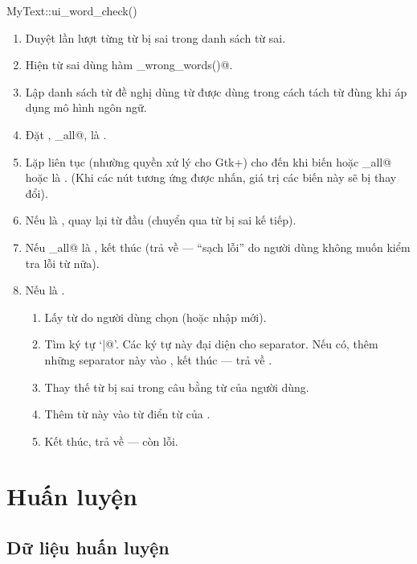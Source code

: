 \documentclass[a4paper,oneside,14pt]{extbook} %
\begin{document}
\begin{algo}
\caption{MyText::ui\_word\_check()}
\label{algo:MyText::ui_word_check}
\begin{enumerate}
\item Duyệt lần lượt từng từ bị sai trong danh sách từ sai.
\item Hiện từ sai dùng hàm \verb@show_wrong_words()@.
\item Lập danh sách từ đề nghị dùng từ được dùng trong cách tách từ
  đùng khi áp dụng mô hình ngôn ngữ.
\item Đặt \verb@processed@, \verb@ignore_all@, \verb@ignore@ là
  \verb@false@. 
\item Lặp liên tục (nhường quyền xử lý cho Gtk+) cho đến khi biến
  \verb@ignore@ hoặc \verb@ignore_all@ hoặc \verb@processed@ là
  \verb@true@. (Khi các nút tương ứng được nhấn, giá trị các biến này
  sẽ bị thay đổi).
\item Nếu \verb@ignore@ là \verb@true@, quay lại từ đầu (chuyển qua từ bị sai
  kế tiếp).
\item Nếu \verb@ignore_all@ là \verb@true@, kết thúc (trả về
  \verb@true@ --- ``sạch lỗi'' do người dùng không muốn kiểm tra lỗi
  từ nữa).
\item Nếu \verb@processed@ là \verb@true@.
  \begin{enumerate}
  \item Lấy từ do người dùng chọn (hoặc nhập mới).
  \item Tìm ký tự `\verb@|@'. Các ký tự này đại diện cho
    separator. Nếu có, thêm những separator này vào \verb@VSpell@, kết thúc
    --- trả về \verb@false@.
  \item Thay thế từ bị sai trong câu bằng từ của người dùng.
  \item Thêm từ này vào từ điển từ của \verb@VSpell@.
  \item Kết thúc, trả về \verb@false@ --- còn lỗi.
  \end{enumerate}
\end{enumerate}
\end{algo}

\section{Huấn luyện}

\subsection{Dữ liệu huấn luyện}
\label{sec:data-preprocessing}
\end{document}
